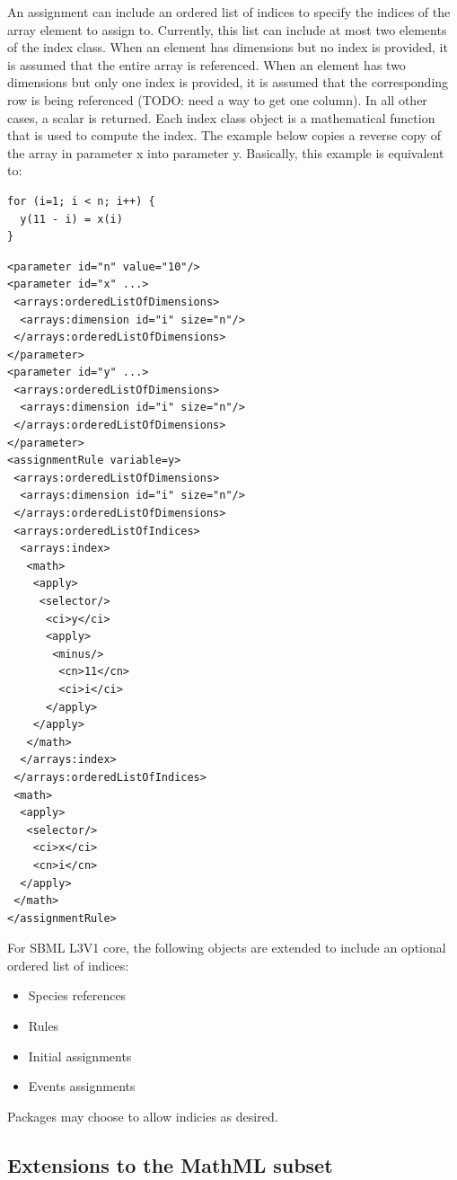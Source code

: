 An assignment can include an ordered list of indices to specify the indices of the array element to assign to.  Currently, this list can include at most two elements of the index class.  When an element has dimensions but no index is provided, it is assumed that the entire array is referenced.  When an element has two dimensions but only one index is provided, it is assumed that the corresponding row is being referenced (TODO: need a way to get one column).  In all other cases, a scalar is returned.  Each index class object is a mathematical function that is used to compute the index.  The example below copies a reverse copy of the array in parameter x into parameter y.  Basically, this example is equivalent to:
\begin{verbatim}
for (i=1; i < n; i++) {
  y(11 - i) = x(i)
}
\end{verbatim}

\begin{verbatim} 
<parameter id="n" value="10"/>
<parameter id="x" ...>
 <arrays:orderedListOfDimensions>
  <arrays:dimension id="i" size="n"/>
 </arrays:orderedListOfDimensions>
</parameter>
<parameter id="y" ...>
 <arrays:orderedListOfDimensions>
  <arrays:dimension id="i" size="n"/>
 </arrays:orderedListOfDimensions>
</parameter>
<assignmentRule variable=y>
 <arrays:orderedListOfDimensions>
  <arrays:dimension id="i" size="n"/>
 </arrays:orderedListOfDimensions>
 <arrays:orderedListOfIndices>
  <arrays:index>
   <math>
    <apply>
     <selector/>
      <ci>y</ci>
      <apply>
       <minus/>
        <cn>11</cn>
        <ci>i</ci>
      </apply>
    </apply>
   </math>
  </arrays:index>
 </arrays:orderedListOfIndices>
 <math>
  <apply>
   <selector/>
    <ci>x</ci>
    <cn>i</cn>
  </apply>
 </math> 
</assignmentRule>
\end{verbatim}

For SBML L3V1 core, the following objects are extended to include an optional ordered list of indices:
\begin{itemize}
\item Species references
\item Rules
\item Initial assignments
\item Events assignments
\end{itemize}
Packages may choose to allow indicies as desired.  

\subsection{Extensions to the MathML subset}

